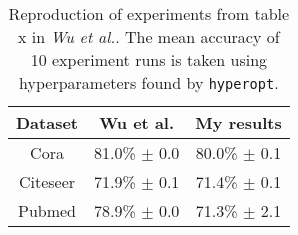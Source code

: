 \begin{table}
    \centering
    \begin{tabular}{c|cc}
        \multicolumn{1}{c}{\textbf{Dataset}} &
        \multicolumn{1}{c}{\textbf{Wu et al.}} &
        \multicolumn{1}{c}{\textbf{My results}} \\
        \midrule
        Cora        & 81.0\% $\pm$ 0.0 & 80.0\% $\pm$ 0.1 \\
        Citeseer    & 71.9\% $\pm$ 0.1 & 71.4\% $\pm$ 0.1 \\
        Pubmed      & 78.9\% $\pm$ 0.0 & 71.3\% $\pm$ 2.1 \\
    \end{tabular}
    \caption{Reproduction of experiments from table x in \textit{Wu et al.}\cite{wu2019simplifying}. The mean accuracy of 10 experiment runs is taken using hyperparameters found by \texttt{hyperopt}.}
    \label{tab:GCN-acc}
\end{table}

